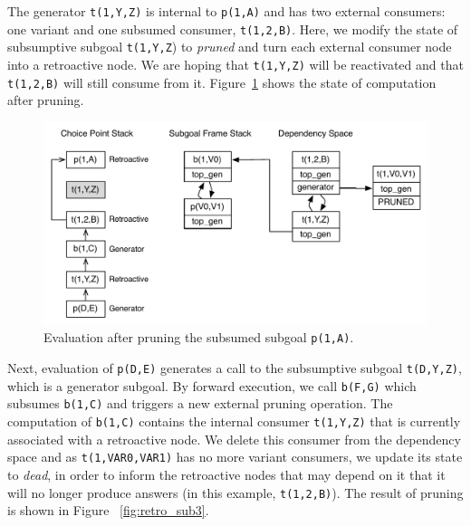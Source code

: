 The generator \texttt{t(1,Y,Z)} is internal to \texttt{p(1,A)} and has two external consumers: one variant
and one subsumed consumer, \texttt{t(1,2,B)}. Here, we modify the state of subsumptive subgoal \texttt{t(1,Y,Z})
to \textit{pruned} and turn each external consumer node into a retroactive node. We are hoping that \texttt{t(1,Y,Z)}
will be reactivated and that \texttt{t(1,2,B)} will still consume from it. Figure~\ref{fig:retro_sub2}
shows the state of computation after pruning.

\begin{figure}[ht]
  \centering
    \includegraphics[scale=0.5]{retro_sub2.pdf}
  \caption{Evaluation after pruning the subsumed subgoal \texttt{p(1,A)}.}
  \label{fig:retro_sub2}
\end{figure}

Next, evaluation of \texttt{p(D,E)} generates a call to the subsumptive subgoal \texttt{t(D,Y,Z)}, which
is a generator subgoal. By forward execution, we call \texttt{b(F,G)} which subsumes \texttt{b(1,C)} and triggers
a new external pruning operation. The computation of \texttt{b(1,C)} contains the internal consumer
\texttt{t(1,Y,Z)} that is currently associated with a retroactive node. We delete this consumer from the
dependency space and as \texttt{t(1,VAR0,VAR1)} has no more variant consumers,
we update its state to \textit{dead}, in order to inform the retroactive nodes that may depend on it that it
will no longer produce answers (in this example, \texttt{t(1,2,B)}). The result of pruning is shown in
Figure ~\ref{fig:retro_sub3}.

